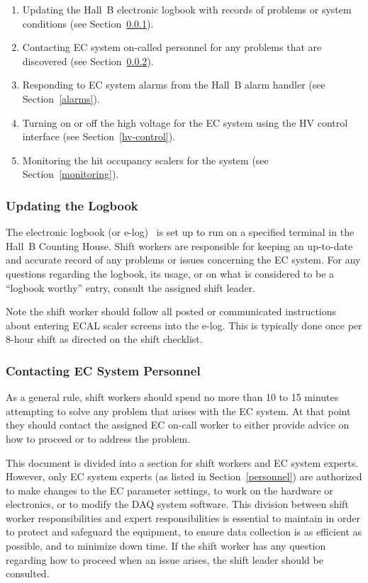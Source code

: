 \documentclass[letterpaper,10pt]{article}
\begin{document}
\begin{enumerate}
\item Updating the Hall~B electronic logbook with records of problems or system conditions (see 
Section~\ref{logbook}).

\item Contacting EC system on-called personnel for any problems that are discovered (see 
Section~\ref{contact}).

\item Responding to EC system alarms from the Hall~B alarm handler (see Section~\ref{alarms}).

\item Turning on or off the high voltage for the EC system using the HV control interface (see 
Section~\ref{hv-control}).

\item Monitoring the hit occupancy scalers for the system (see Section~\ref{monitoring}).
\end{enumerate}

\subsubsection{Updating the Logbook}
\label{logbook}

The electronic logbook (or e-log)~\cite{e-log} is set up to run on a specified terminal in the 
Hall~B Counting House. Shift workers are responsible for keeping an up-to-date and accurate record
of any problems or issues concerning the EC system. For any questions regarding the logbook, its
usage, or on what is considered to be a ``logbook worthy'' entry, consult the assigned shift leader.

Note the shift worker should follow all posted or communicated instructions about entering ECAL
scaler screens into the e-log. This is typically done once per 8-hour shift as directed on the
shift checklist.

\subsubsection{Contacting EC System Personnel}
\label{contact}

As a general rule, shift workers should spend no more than 10 to 15 minutes attempting to solve
any problem that arises with the EC system. At that point they should contact the assigned 
EC on-call worker to either provide advice on how to proceed or to address the problem.

This document is divided into a section for shift workers and EC system experts. However, only 
EC system experts (as listed in Section~\ref{personnel}) are authorized to make changes to the EC
parameter settings, to work on the hardware or electronics, or to modify the DAQ system 
software. This division between shift worker responsibilities and expert responsibilities is
essential to maintain in order to protect and safeguard the equipment, to ensure data collection
is as efficient as possible, and to minimize down time. If the shift worker has any question 
regarding how to proceed when an issue arises, the shift leader should be consulted.
\end{document}
